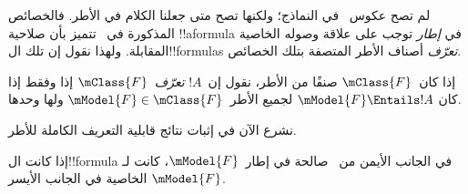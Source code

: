 \documentclass[../../../include/open-logic-section]{subfiles}
\begin{document}


لم تصح عكوس~ في النماذج؛ ولكنها تصح
متى جعلنا الكلام في الأطر. فالخصائص المذكورة
في~ تتميز بأن صلاحية !!a{formula}
في \emph{إطار} توجب على علاقة وصوله الخاصية المقابلة.
ولهذا نقول إن تلك ال!!{formula}s \emph{تعرّف} أصناف الأطر المتصفة
بتلك الخصائص.

\begin{defn}
  إذا كان~$\mClass{F}$ صنفًا من الأطر، نقول إن~$!A$
  \emph{تعرّف}~$\mClass{F}$ إذا وفقط إذا كان
  $\mModel{F} \Entails !A$ لجميع الأطر~$\mModel{F} \in \mClass{F}$
  ولها وحدها.
\end{defn}

نشرع الآن في إثبات نتائج قابلية التعريف الكاملة للأطر.

\begin{thm}
إذا كانت ال!!{formula} في الجانب الأيمن من~
صالحة في إطار~$\mModel{F}$، كانت لـ$\mModel{F}$ الخاصية في الجانب
الأيسر.
\end{thm}
\end{document}

